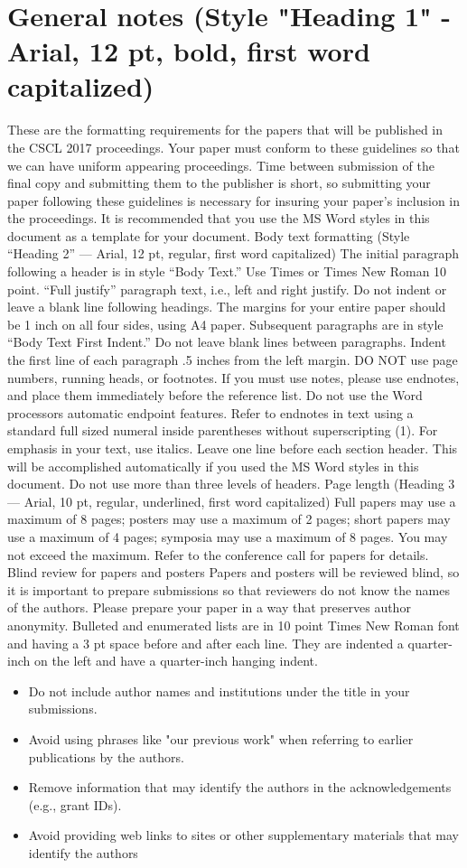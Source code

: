 \documentclass{article}
\title{     }
\author{     }
\date{     }
\begin{document}
\section{General notes (Style "Heading 1" - Arial, 12 pt, bold, first word capitalized)}
These are the formatting requirements for the papers that will be published in the CSCL 2017 proceedings. Your
paper must conform to these guidelines so that we can have uniform appearing proceedings. Time between
submission of the final copy and submitting them to the publisher is short, so submitting your paper following
these guidelines is necessary for insuring your paper’s inclusion in the proceedings. It is recommended that you
use the MS Word styles in this document as a template for your document.
Body text formatting (Style “Heading 2” — Arial, 12 pt, regular, first word capitalized)
The initial paragraph following a header is in style “Body Text.” Use Times or Times New Roman 10 point.
“Full justify” paragraph text, i.e., left and right justify. Do not indent or leave a blank line following headings.
The margins for your entire paper should be 1 inch on all four sides, using A4 paper.
Subsequent paragraphs are in style “Body Text First Indent.” Do not leave blank lines between
paragraphs. Indent the first line of each paragraph .5 inches from the left margin.
DO NOT use page numbers, running heads, or footnotes. If you must use notes, please use endnotes,
and place them immediately before the reference list. Do not use the Word processors automatic endpoint
features. Refer to endnotes in text using a standard full sized numeral inside parentheses without superscripting
(1). For emphasis in your text, use italics.
Leave one line before each section header. This will be accomplished automatically if you used the MS
Word styles in this document. Do not use more than three levels of headers.
Page length (Heading 3 — Arial, 10 pt, regular, underlined, first word capitalized)
Full papers may use a maximum of 8 pages; posters may use a maximum of 2 pages; short papers may use a
maximum of 4 pages; symposia may use a maximum of 8 pages. You may not exceed the maximum. Refer to the
conference call for papers for details.
Blind review for papers and posters
Papers and posters will be reviewed blind, so it is important to prepare submissions so that reviewers do not
know the names of the authors. Please prepare your paper in a way that preserves author anonymity. Bulleted
and enumerated lists are in 10 point Times New Roman font and having a 3 pt space before and after each line.
They are indented a quarter-inch on the left and have a quarter-inch hanging indent.
\begin{itemize}
\item Do not include author names and institutions under the title in your submissions.
\item Avoid using phrases like "our previous work" when referring to earlier publications by the authors.
\item Remove information that may identify the authors in the acknowledgements (e.g., grant IDs).
\item Avoid providing web links to sites or other supplementary materials that may identify the authors
\end{itemize}
\end{document}
